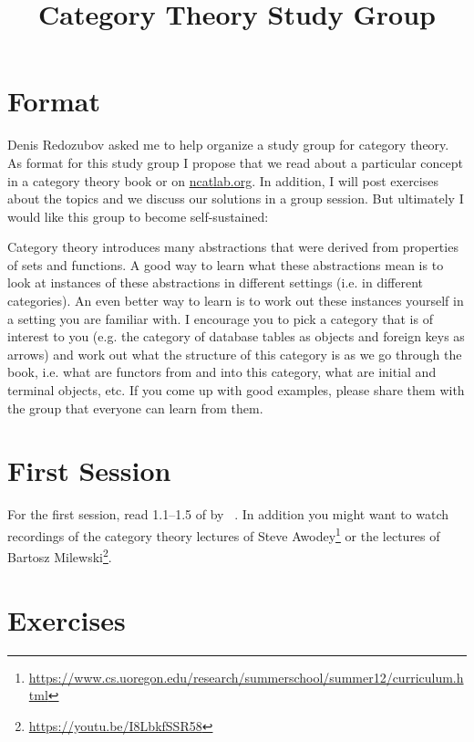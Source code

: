 \documentclass{scrartcl}
\title{Category Theory Study Group}
\date{}
\begin{document}
\maketitle

\section*{Format}
Denis Redozubov asked me to help organize a study group for category theory.
As format for this study group I propose that we read about a
particular concept in a category theory book or on \url{ncatlab.org}.
In addition, I will post exercises about the topics and we discuss our
solutions in a group session. But ultimately I would like this group
to become self-sustained:

Category theory introduces many abstractions that were derived from
properties of sets and functions.
A good way to learn what these abstractions mean is to look at
instances of these abstractions in different settings (i.e. in
different categories).
An even better way to learn is to work out these instances yourself in
a setting you are familiar with.
I encourage you to pick a category that is of interest to you
(e.g. the category of database tables as objects and foreign keys as
arrows) and work out what the structure of this category is as we go
through the book, i.e. what are functors from and into this category,
what are initial and terminal objects, etc.
If you come up with good examples, please share them with the group
that everyone can learn from them.

\section*{First Session}
For the first session, read 1.1--1.5 of  by
\citeauthor{Awodey2010}~\cite{Awodey2010}. In addition you might want
to watch recordings of the category theory lectures of Steve
Awodey\footnote{\url{https://www.cs.uoregon.edu/research/summerschool/summer12/curriculum.html}}
or the lectures of Bartosz Milewski\footnote{\url{https://youtu.be/I8LbkfSSR58}}.

\newpage

\section*{Exercises}
\end{document}

